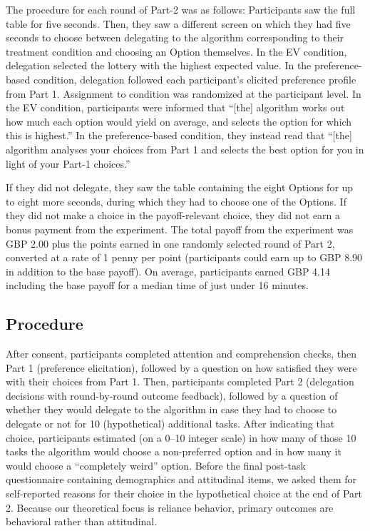 \documentclass[a4paper, 12pt, fleqn]{article}
\theoremstyle{definition}
\begin{document}
The procedure for each round of Part-2 was as follows: Participants saw the full table for five seconds. Then, they saw a different screen on which they had five seconds to choose between delegating to the algorithm corresponding to their treatment condition and choosing an Option themselves.
In the EV condition, delegation selected the lottery with the highest expected value. In the preference-based condition, delegation followed each participant's elicited preference profile from Part 1. Assignment to condition was randomized at the participant level. In the EV condition, participants were informed that ``[the] algorithm works out how much each option would yield on average, and selects the option for which this is highest.'' In the preference-based condition, they instead read that ``[the] algorithm analyses your choices from Part 1 and selects the best option for you in light of your Part-1 choices.''

If they did not delegate, they saw the table containing the eight Options for up to eight more seconds, during which they had to choose one of the Options. If they did not make a choice in the payoff-relevant choice, they did not earn a bonus payment from the experiment. The total payoff from the experiment was GBP 2.00 plus the points earned in one randomly selected round of Part 2, converted at a rate of 1 penny per point (participants could earn up to GBP 8.90 in addition to the base payoff). On average, participants earned GBP 4.14 including the base payoff for a median time of just under 16 minutes.

\subsection{Procedure}
After consent, participants completed attention and comprehension checks, then Part 1 (preference elicitation), followed by a question on how satisfied they were with their choices from Part 1. Then, participants completed Part 2 (delegation decisions with round-by-round outcome feedback), followed by a question of whether they would delegate to the algorithm in case they had to choose to delegate or not for 10 (hypothetical) additional tasks. After indicating that choice, participants estimated (on a 0--10 integer scale) in how many of those 10 tasks the algorithm would choose a non-preferred option and in how many it would choose a ``completely weird'' option. Before the final post-task questionnaire containing demographics and attitudinal items, we asked them for self-reported reasons for their choice in the hypothetical choice at the end of Part 2. Because our theoretical focus is reliance behavior, primary outcomes are behavioral rather than attitudinal.
\end{document}
